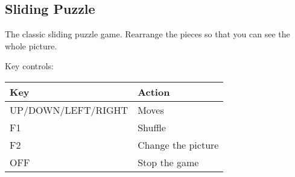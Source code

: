 \subsection{Sliding Puzzle}

The classic sliding puzzle game.  Rearrange the pieces so that you can
see the whole picture.

Key controls:

\begin{table}[h!]
\begin{center}
\begin{tabular}{@{}ll@{}}\toprule
\textbf{Key} & \textbf{Action}\\\midrule
UP/DOWN/LEFT/RIGHT & Moves \\
F1 & Shuffle \\
F2 & Change the picture \\
OFF & Stop the game \\\bottomrule
\end{tabular}
\end{center}
\end{table}
